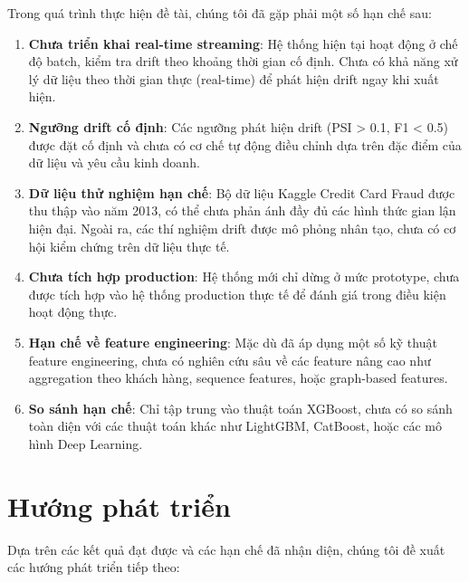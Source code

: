 Trong quá trình thực hiện đề tài, chúng tôi đã gặp phải một số hạn chế sau:

\begin{enumerate}
    \item \textbf{Chưa triển khai real-time streaming}: Hệ thống hiện tại hoạt động ở chế độ batch, kiểm tra drift theo khoảng thời gian cố định. Chưa có khả năng xử lý dữ liệu theo thời gian thực (real-time) để phát hiện drift ngay khi xuất hiện.
    
    \item \textbf{Ngưỡng drift cố định}: Các ngưỡng phát hiện drift (PSI > 0.1, F1 < 0.5) được đặt cố định và chưa có cơ chế tự động điều chỉnh dựa trên đặc điểm của dữ liệu và yêu cầu kinh doanh.
    
    \item \textbf{Dữ liệu thử nghiệm hạn chế}: Bộ dữ liệu Kaggle Credit Card Fraud được thu thập vào năm 2013, có thể chưa phản ánh đầy đủ các hình thức gian lận hiện đại. Ngoài ra, các thí nghiệm drift được mô phỏng nhân tạo, chưa có cơ hội kiểm chứng trên dữ liệu thực tế.
    
    \item \textbf{Chưa tích hợp production}: Hệ thống mới chỉ dừng ở mức prototype, chưa được tích hợp vào hệ thống production thực tế để đánh giá trong điều kiện hoạt động thực.
    
    \item \textbf{Hạn chế về feature engineering}: Mặc dù đã áp dụng một số kỹ thuật feature engineering, chưa có nghiên cứu sâu về các feature nâng cao như aggregation theo khách hàng, sequence features, hoặc graph-based features.
    
    \item \textbf{So sánh hạn chế}: Chỉ tập trung vào thuật toán XGBoost, chưa có so sánh toàn diện với các thuật toán khác như LightGBM, CatBoost, hoặc các mô hình Deep Learning.
\end{enumerate}

\section{Hướng phát triển}

Dựa trên các kết quả đạt được và các hạn chế đã nhận diện, chúng tôi đề xuất các hướng phát triển tiếp theo:

